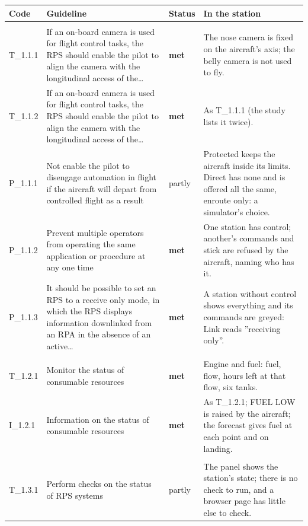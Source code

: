 \begin{longtable}{@{}>{\raggedright\arraybackslash}p{12mm}>{\raggedright\arraybackslash}p{57mm}>{\raggedright\arraybackslash}p{13mm}>{\raggedright\arraybackslash}p{70mm}@{}}
\toprule
\textbf{Code} & \textbf{Guideline} & \textbf{Status} & \textbf{In the station} \\
\midrule
\endhead
\addlinespace\multicolumn{4}{@{}l}{\textbf{Aircraft systems and automation}} \\
T\_1.1.1 & If an on-board camera is used for flight control tasks, the RPS should enable the pilot to align the camera with the longitudinal access of the\ldots{} & \textbf{met} & The nose camera is fixed on the aircraft's axis; the belly camera is not used to fly. \\
T\_1.1.2 & If an on-board camera is used for flight control tasks, the RPS should enable the pilot to align the camera with the longitudinal access of the\ldots{} & \textbf{met} & As T\_1.1.1 (the study lists it twice). \\
P\_1.1.1 & Not enable the pilot to disengage automation in flight if the aircraft will depart from controlled flight as a result & partly & Protected keeps the aircraft inside its limits. Direct has none and is offered all the same, enroute only: a simulator's choice. \\
P\_1.1.2 & Prevent multiple operators from operating the same application or procedure at any one time & \textbf{met} & One station has control; another's commands and stick are refused by the aircraft, naming who has it. \\
P\_1.1.3 & It should be possible to set an RPS to a receive only mode, in which the RPS displays information downlinked from an RPA in the absence of an active\ldots{} & \textbf{met} & A station without control shows everything and its commands are greyed: Link reads ''receiving only''. \\
\addlinespace\multicolumn{4}{@{}l}{\textbf{Consumables}} \\
T\_1.2.1 & Monitor the status of consumable resources & \textbf{met} & Engine and fuel: fuel, flow, hours left at that flow, six tanks. \\
I\_1.2.1 & Information on the status of consumable resources & \textbf{met} & As T\_1.2.1; FUEL LOW is raised by the aircraft; the forecast gives fuel at each point and on landing. \\
\addlinespace\multicolumn{4}{@{}l}{\textbf{The station itself}} \\
T\_1.3.1 & Perform checks on the status of RPS systems & partly & The panel shows the station's state; there is no check to run, and a browser page has little else to check. \\

\end{longtable}
